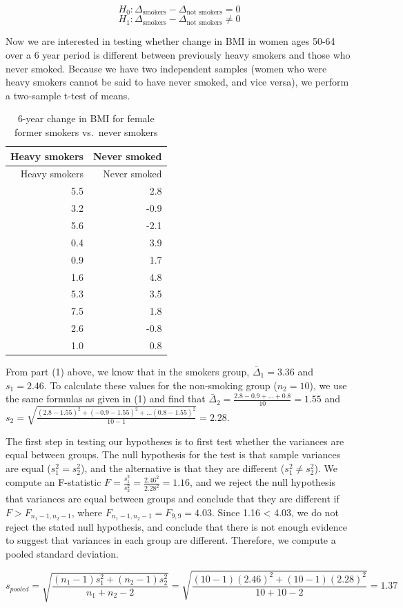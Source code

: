 \documentclass[]{article}
\begin{document}
\[H_0: \Delta_{\text{smokers}} - \Delta_{\text{not smokers}} = 0\]
\[H_1: \Delta_{\text{smokers}} - \Delta_{\text{not smokers}} \neq 0\]

Now we are interested in testing whether change in BMI in women ages
50-64 over a 6 year period is different between previously heavy smokers
and those who never smoked. Because we have two independent samples
(women who were heavy smokers cannot be said to have never smoked, and
vice versa), we perform a two-sample t-test of means.

\begin{longtable}[]{@{}rr@{}}
\caption{6-year change in BMI for female former smokers vs.~never
smokers}\tabularnewline
\toprule
Heavy smokers & Never smoked\tabularnewline
\midrule
\endfirsthead
\toprule
Heavy smokers & Never smoked\tabularnewline
\midrule
\endhead
5.5 & 2.8\tabularnewline
3.2 & -0.9\tabularnewline
5.6 & -2.1\tabularnewline
0.4 & 3.9\tabularnewline
0.9 & 1.7\tabularnewline
1.6 & 4.8\tabularnewline
5.3 & 3.5\tabularnewline
7.5 & 1.8\tabularnewline
2.6 & -0.8\tabularnewline
1.0 & 0.8\tabularnewline
\bottomrule
\end{longtable}

From part (1) above, we know that in the smokers group,
\(\bar{\Delta}_1 = 3.36\) and \(s_1 = 2.46\). To calculate these values
for the non-smoking group (\(n_2 = 10\)), we use the same formulas as
given in (1) and find that
\(\bar{\Delta}_2 = \frac{2.8 - 0.9 + ... + 0.8}{10} = 1.55\) and
\(s_2 = \sqrt{\frac{(2.8-1.55)^2 + (-0.9-1.55)^2 + ... (0.8-1.55)^2}{10-1}} = 2.28\).

The first step in testing our hypotheses is to first test whether the
variances are equal between groups. The null hypothesis for the test is
that sample variances are equal (\(s_1^2 = s_2^2\)), and the alternative
is that they are different (\(s_1^2 \neq s_2^2\)). We compute an
F-statistic \(F = \frac{s_1^2}{s_2^2} = \frac{2.46^2}{2.28^2} = 1.16\),
and we reject the null hypothesis that variances are equal between
groups and conclude that they are different if \(F > F_{n_1-1, n_2-1}\),
where \(F_{n_1-1, n_2-1} = F_{9,9} = 4.03\). Since 1.16 \textless{}
4.03, we do not reject the stated null hypothesis, and conclude that
there is not enough evidence to suggest that variances in each group are
different. Therefore, we compute a pooled standard deviation.

\[s_{pooled} = \sqrt{\frac{(n_1-1)s_1^2 + (n_2-1)s_2^2}{n_1 + n_2 -2}} = \sqrt{\frac{(10-1)(2.46)^2 + (10-1)(2.28)^2}{10 + 10 -2}} = 1.37\]
\end{document}
